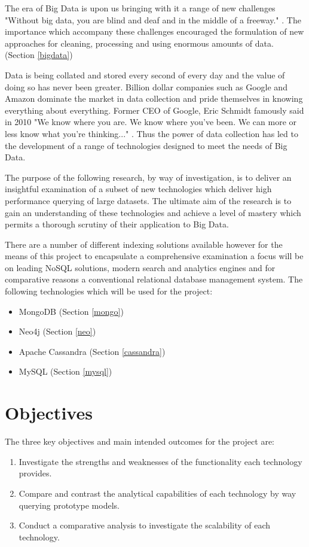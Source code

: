 The era of Big Data is upon us bringing with it a range of new challenges "Without big data, you are blind and deaf and in the middle of a freeway."\cite{moore} . The importance which accompany these challenges encouraged the formulation of new approaches for cleaning, processing and using enormous amounts of data. (Section \ref{bigdata})

Data is being collated and stored every second of every day and the value of doing so has never been greater. Billion dollar companies such as Google and Amazon dominate the market in data collection and pride themselves in knowing everything about everything. Former CEO of Google, Eric Schmidt famously said in 2010 "We know where you are. We know where you've been. We can more or less know what you're thinking..." \cite{schmidt}. Thus the power of data collection has led to the development of a range of technologies designed to meet the needs of Big Data.

The purpose of the following research, by way of investigation, is to deliver an insightful examination of a subset of new technologies which deliver high performance querying of large datasets. The ultimate aim of the research is to gain an understanding of these technologies and achieve a level of mastery which permits a thorough scrutiny of their application to Big Data.

There are a number of different indexing solutions available however for the means of this project to encapsulate a comprehensive examination a focus will be on leading NoSQL solutions, modern search and analytics engines and for comparative reasons a conventional relational database management system. The following technologies which will be used for the project: 

\begin{itemize}
\item MongoDB (Section \ref{mongo})
\item Neo4j (Section \ref{neo})
\item Apache Cassandra (Section \ref{cassandra})
\item MySQL (Section \ref{mysql})
\end{itemize}

\section{Objectives}\label{objectives}
The three key objectives and main intended outcomes for the project are:
\begin{enumerate}
\item Investigate the strengths and weaknesses of the functionality each technology provides.
\item Compare and contrast the analytical capabilities of each technology by way querying prototype models.
\item Conduct a comparative analysis to investigate the scalability of each technology.
\end{enumerate}

